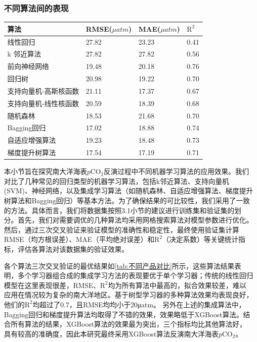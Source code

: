 \subsubsection{不同算法间的表现}
\begin{table}[htbp]
\centering
{}
    \begin{tabularx}{\textwidth}{>{\centering\arraybackslash}X m{2cm} m{2cm} m{2cm}}
    \toprule
    算法  & RMSE($\mu atm$) & MAE($\mu atm$) & $\mathrm{R^2}$  \\ \midrule
    线性回归                    &  27.82  &  23.23  & 0.41  \\
    k 邻近算法                  & 27.82 & 27.82 & 0.56 \\
    前向神经网络                 & 19.48 & 20.18 & 0.76 \\
    回归树                      & 20.98 & 19.22  &0.70   \\
    支持向量机-高斯核函数         & 21.11 & 17.37 & 0.67 \\ 
    支持向量机-线性核函数         & 20.59 & 18.39 & 0.68 \\ 
    随机森林                    & 18.53 & 21.68 & 0.70 \\
    Bagging回归                 & 17.02 &18.88  &0.74\\
    自适应增强算法               &19.23  & 18.48 &0.73 \\
    梯度提升树算法               & 17.54 &17.19 & 0.71 \\
    \bottomrule
    \end{tabularx}
\end{table}

本小节旨在探究南大洋海表$p\mathrm{CO_2}$反演过程中不同机器学习算法的应用效果。我们对比了几种常见的回归类型的机器学习算法，包括k邻近算法、支持向量机(SVM)、神经网络，以及集成学习算法（如随机森林、自适应增强算法、梯度提升树算法和Bagging回归）等基本方法。为了确保结果的可比较性，我们采用了一致的方法。具体而言，我们将数据集按照3.1小节的建议进行训练集和验证集的划分。首先，我们对需要调优的几种算法均采用网格搜索算法对模型参数进行优化。然后，通过三次交叉验证来验证模型的准确性和稳定性，最终使用验证集计算RMSE（均方根误差）、MAE（平均绝对误差）和$\mathrm{R^2}$（决定系数）等关键统计指标，评估各算法对该数据集的验证效果。

各个算法三次交叉验证的最优结果如\autoref{tab:不同产品对比}所示，这些算法结果表明，多个学习器组合成的集成学习方法的表现要优于单个学习器；传统的线性回归模型在这里表现很差，RMSE、$\mathrm{R^2}$均为所有算法中最高的，拟合效果较差，难以应用在情况较为复杂的南大洋地区。基于树型学习器的多种算法效果均表现良好，他们的$\mathrm{R^2}$均超过了0.7，且RMSE均均小于20μatm。
另外在上述的集成算法中，Bagging回归和梯度提升算法均取得了不错的效果，效果略低于XGBoost算法。结合所有算法的结果，XGBoost算法的效果最为突出，三个指标均比其他算法好，具有较高的准确度，因此本研究最终采用XGBoost算法反演南大洋海表$p\mathrm{CO_2}$。

